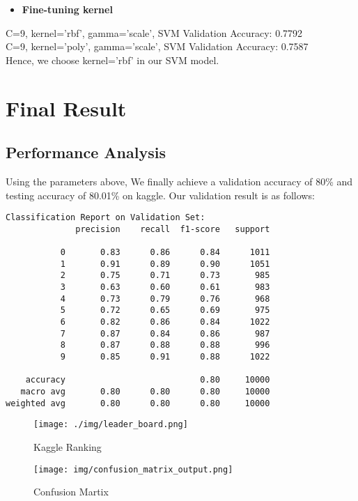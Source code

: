 \documentclass[a4paper,11pt]{article}
\begin{document}
\begin{itemize}
    \item \textbf{Fine-tuning kernel}
\end{itemize}
C=9, kernel='rbf', gamma='scale', SVM Validation Accuracy: 0.7792 \\
C=9, kernel='poly', gamma='scale', SVM Validation Accuracy: 0.7587 \\
Hence, we choose kernel='rbf' in our SVM model.

\section{Final Result}

\subsection{Performance Analysis}
Using the parameters above, 
We finally achieve a validation accuracy of 80\% and testing accuracy of 80.01\% on kaggle. Our validation result is as follows:
\begin{verbatim}
Classification Report on Validation Set:
              precision    recall  f1-score   support

           0       0.83      0.86      0.84      1011
           1       0.91      0.89      0.90      1051
           2       0.75      0.71      0.73       985
           3       0.63      0.60      0.61       983
           4       0.73      0.79      0.76       968
           5       0.72      0.65      0.69       975
           6       0.82      0.86      0.84      1022
           7       0.87      0.84      0.86       987
           8       0.87      0.88      0.88       996
           9       0.85      0.91      0.88      1022

    accuracy                           0.80     10000
   macro avg       0.80      0.80      0.80     10000
weighted avg       0.80      0.80      0.80     10000
\end{verbatim}

\begin{figure}[H]
    \centering
    \texttt{[image: ./img/leader\_board.png]}
    \caption{Kaggle Ranking}
    \label{fig:enter-label}
\end{figure}

\begin{figure}[H]
    \centering
    \texttt{[image: img/confusion\_matrix\_output.png]}
    \caption{Confusion Martix}
    \label{fig:enter-label}
\end{figure}
\end{document}
